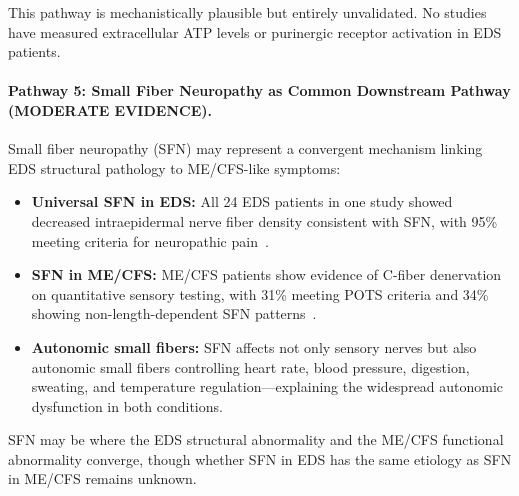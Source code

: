 This pathway is mechanistically plausible but entirely unvalidated. No studies have measured extracellular ATP levels or purinergic receptor activation in EDS patients.

\paragraph{Pathway 5: Small Fiber Neuropathy as Common Downstream Pathway (MODERATE EVIDENCE).}

Small fiber neuropathy (SFN) may represent a convergent mechanism linking EDS structural pathology to ME/CFS-like symptoms:

\begin{itemize}
    \item \textbf{Universal SFN in EDS:} All 24 EDS patients in one study showed decreased intraepidermal nerve fiber density consistent with SFN, with 95\% meeting criteria for neuropathic pain~\cite{Cazzato2016sfn}.

    \item \textbf{SFN in ME/CFS:} ME/CFS patients show evidence of C-fiber denervation on quantitative sensory testing, with 31\% meeting POTS criteria and 34\% showing non-length-dependent SFN patterns~\cite{Azcue2023sfn}.

    \item \textbf{Autonomic small fibers:} SFN affects not only sensory nerves but also autonomic small fibers controlling heart rate, blood pressure, digestion, sweating, and temperature regulation---explaining the widespread autonomic dysfunction in both conditions.
\end{itemize}

SFN may be where the EDS structural abnormality and the ME/CFS functional abnormality converge, though whether SFN in EDS has the same etiology as SFN in ME/CFS remains unknown.


